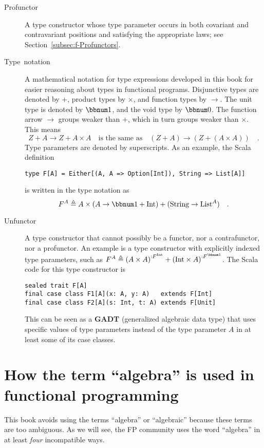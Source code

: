 \begin{description}
\item [{Profunctor}] A type constructor whose type parameter
occurs in both covariant and contravariant positions and satisfying
the appropriate laws; see Section~\ref{subsec:f-Profunctors}.
\item [{Type~notation}] A mathematical notation
for type expressions developed in this book for easier reasoning about
types in functional programs. Disjunctive types are denoted by $+$,
product types by $\times$, and function types by $\rightarrow$.
The unit type is denoted by $\bbnum 1$, and the void type by $\bbnum 0$.
The function arrow $\rightarrow$ groups weaker than $+$, which in
turn groups weaker than $\times$. This means
\[
Z+A\rightarrow Z+A\times A\quad\text{is the same as}\quad\left(Z+A\right)\rightarrow\left(Z+\left(A\times A\right)\right)\quad.
\]
 Type parameters are denoted by superscripts. As an example, the Scala
definition\texttt{}
\begin{lstlisting}
type F[A] = Either[(A, A => Option[Int]), String => List[A]]
\end{lstlisting}
is written in the type notation as 
\[
F^{A}\triangleq A\times\left(A\rightarrow\bbnum 1+\text{Int}\right)+(\text{String}\rightarrow\text{List}^{A})\quad.
\]
\item [{Unfunctor}] A type constructor that cannot possibly
be a functor, nor a contrafunctor, nor a profunctor. An example is
a type constructor with explicitly indexed type parameters, such as
$F^{A}\triangleq\left(A\times A\right)^{:F^{\text{Int}}}+\left(\text{Int}\times A\right)^{:F^{\bbnum 1}}$.
The Scala code for this type constructor is
\begin{lstlisting}
sealed trait F[A]
final case class F1[A](x: A, y: A)   extends F[Int]
final case class F2[A](s: Int, t: A) extends F[Unit]
\end{lstlisting}
This can be seen as a \textbf{GADT}
(generalized algebraic data type) that uses specific values of type
parameters instead of the type parameter $A$ in at least some of
its case classes.
\end{description}

\section{How the term \textsf{``}algebra\textsf{''} is used in functional programming}

This book avoids using the terms \textsf{``}algebra\textsf{''} or
\textsf{``}algebraic\textsf{''} because these terms are too ambiguous.
As we will see, the FP community uses the word \textsf{``}algebra\textsf{''} in at
least \emph{four} incompatible ways.

